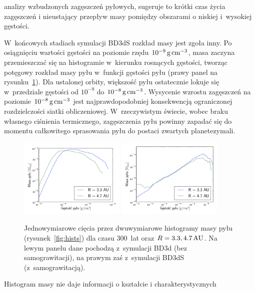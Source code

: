 analizy wzbudzonych zagęszczeń pyłowych, sugeruje to krótki czas życia
zagęszczeń i nieustający przepływ masy pomiędzy obszarami o niskiej i~wysokiej
gęstości. 
\par W~końcowych stadiach symulacji BD3dS rozkład masy jest zgoła
inny. Po osiągnięciu wartości gęstości na poziomie rzędu $10^{-9}\hbox{$\thinspace\textrm{g}$}\hbox{$\thinspace\textrm{cm}$}^{-3}$, masa
zaczyna przemieszczać się na histogramie w~kierunku rosnących gęstości, tworząc
potęgowy rozkład masy pyłu w~funkcji gęstości pyłu (prawy panel na
rysunku~\ref{fig:hists1d}). Dla ustalonej orbity, większość pyłu ostatecznie
lokuje się w~przedziale gęstości od $10^{-9}$ do $10^{-8}\hbox{$\thinspace\textrm{g}$}\hbox{$\thinspace\textrm{cm}$}^{-3}$.  Wysycenie
wzrostu zagęszczeń na poziomie $10^{-8}\hbox{$\thinspace\textrm{g}$}\hbox{$\thinspace\textrm{cm}$}^{-3}$ jest najprawdopodobniej
konsekwencją ograniczonej rozdzielczości siatki obliczeniowej. W~rzeczywistym
świecie, wobec braku własnego ciśnienia termicznego, zagęszczenia pyłu powinny
zapadać się do momentu całkowitego sprasowania pyłu do postaci zwartych
planetezymali.
%
\begin{figure} 
  \centering
  \includegraphics[width=0.45\textwidth]{figures/hist1d_nosg}
  \includegraphics[width=0.45\textwidth]{figures/hist1d_sg}
  \caption[Histogramy masy pyłu dla wybranych orbit w~symulacjach BD3d i BD3dS.]
  {Jednowymiarowe cięcia przez dwuwymiarowe histogramy masy pyłu
  (rysunek~\ref{fig:hists}) dla czasu 300~lat oraz $R = 3.3, 4.7\hbox{$\thinspace\textrm{AU}$}$. Na lewym
  panelu dane pochodzą z~symulacji BD3d (bez samograwitacji), na prawym zaś
  z~symulacji BD3dS (z~samograwitacją).}
  \label{fig:hists1d} 
\end{figure}
%
\par Histogram masy nie daje informacji o kształcie i charakterystycznych
